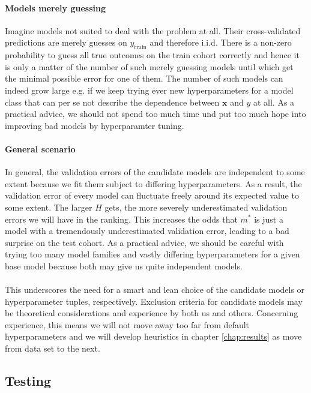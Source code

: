 \paragraph{Models merely guessing}
Imagine models not suited to deal with the problem at all. Their cross-validated predictions are 
merely guesses on $y_\text{train}$ and therefore i.i.d. There is a non-zero probability to guess
all true outcomes on the train cohort correctly and hence it is only a matter of the number of 
such merely guessing models until which get the minimal possible error for one of them. The number of 
such models can indeed grow large e.g. if we keep trying ever new hyperparameters for a model class 
that can per se not describe the dependence between $\mathbf{x}$ and $y$ at all.
As a practical advice, we should not spend too much time und put too much hope into improving 
bad models by hyperparamter tuning.

\paragraph{General scenario}
In general, the validation errors of the candidate models are independent to some extent because we fit them
subject to differing hyperparameters. As a result, the validation error of every model can 
fluctuate freely around its expected value to some extent. The larger $H$ gets, the 
more severely underestimated validation errors we will have in the ranking. This 
increases the odds that $m^*$ is just a model with a tremendously underestimated validation error, 
leading to a bad surprise on the test cohort. As a practical advice, we should be careful with 
trying too many model families and vastly differing hyperparameters for a given base model 
because both may give us quite independent models.

\paragraph{}
This underscores the need for a smart and lean choice of the candidate models or hyperparameter 
tuples, respectively. Exclusion criteria for candidate models may be theoretical considerations
and experience by both us and others. Concerning experience, this means we will not move away too 
far from default hyperparameters and we will develop heuristics in chapter \ref{chap:results} as 
move from data set to the next.

\subsection{Testing}

